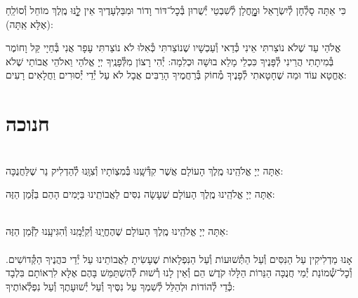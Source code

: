 \documentclass[twoside, openany, parskip=half, 11pt]{book}
\begin{document}
כִּי אַתָּה סָלְ֯חָן לְ֯יִשְׂרָאֵל וּמׇׇׇׇׇׇׇׇחֳלָן לְ֯שִׁבְטֵי יְ֯שֻׁרוּן בְּ֯כׇל־דּוֹר וָדוֹר
וּמִבַּלְעָדֶיךָ אֵין לׇׇׇׇֽנּוּ מֶֽלֶךְ מוֹחֵל וְ֯סוֹלֵֽחַ (אֶלָּא אַֽתָּה):

אֱלֹהַי עַד שֶׁלֹא נוֹצַרתִּי אֵינִי כְּ֯דַאי וְ֯עַכְשָׁיו שֶׁנוֹצַרתִּי כְּ֯אִלוּ לֹא נוֹצַרתִּי עָפָר אֲנִי בְּ֯חַיָי קַּל וָחוֹמֶר בְּ֯מִיתָתִי הֲרֵינִי לְ֯פָּנֶיךָ כִּכְלֵי מָלֵא בוּשָׁה וּכְלִמָה: יְ֯הִי רָצוֹן מִלְּ֯פָנֶֽיךָ יְיָ אֱלֹהַי וֵאלֹהֵי אֲבוֹתַי שֶׁלֹא אֶחֱטָא עוֹד וּמַה שֶׁחָטָאתִי לְ֯פָנֶיךָ מְ֯חוֹק בְּ֯רַחֲמֶיךָ הָרַבִּים אֲבָל לֹא עַל יְ֯דֵי יְ֯סוּרִים וַחֲלָאִים רָעִים:

\vfill
\sepline

\chapter[חנוכה]{ חנוכה }
\label{chanukah}

\\
אַתָּה יְיָ אֱלֹהֵֽינוּ מֶֽלֶךְ הָעוֹלָם
אֲשֶׁר קִדְּ֯שָֽׁנוּ בְּ֯מִצְוֹתָיו וְ֯צִוָּֽנוּ לְ֯הַדְלִיק נֵר שֶׁלַּחֲנֻכָּה:

אַתָּה יְיָ אֱלֹהֵֽינוּ מֶֽלֶךְ הָעוֹלָם שֶׁעָשָׂה נִסִּים לַאֲבוֹתֵֽינוּ בַּיָּמִים הָהֵם בַּזְּ֯מַן הַזֶּה:

\\
אַתָּה יְיָ אֱלֹהֵֽינוּ מֶֽלֶךְ הָעוֹלָם שֶׁהֶחֱיָֽנוּ וְ֯קִיְּ֯מָֽנוּ וְ֯הִגִּיעָֽנוּ לַזְּ֯מַן הַזֶּה:\\

\\
אָנוּ מַדְלִיקִין
עַל הַנִּסִּים וְ֯עַל הַתְּ֯שׁוּעוֹת
וְ֯עַל הַנִּפְלָאוֹת
שֶׁעָשִׂיתָ לַאֲבוֹתֵינוּ
עַל יְ֯דֵי כּהֲנֶיךָ הַקְּ֯דוֹשִׁים.
וְ֯כׇל־שְׁ֯מוֹנַת יְ֯מֵי חֲנֻכָּה
הַנֵּרוֹת הַלָּלוּ קֹדֶשׁ הֵם
וְ֯אֵין לָנוּ רְ֯שׁוּת לְ֯הִשְׁתַּמֵּשׁ בָּהֶם
אֶלָּא לִרְאוֹתָם בִּלְבָד
כְּ֯דֵי לְ֯הוֹדוֹת וּלְהַלֵּל לְ֯שִׁמְךָ
עַל נִסֶּיךָ וְ֯עַל יְ֯שׁוּעָתֶךָ
וְ֯עַל נִפְלְ֯אוֹתֶיךָ:
\end{document}
